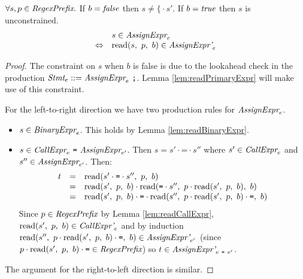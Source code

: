 \documentclass[preprint,10pt]{sigplanconf}
\begin{document}
\begin{lemma}\mbox{}
  
  \( \forall s, p \in \textit{RegexPrefix}. \)
  If \( b = \textit{false} \) then \( s \not = \texttt{\{} \cdot s' \). If \(
  b = \textit{true} \) then \( s \) is unconstrained.
  \[ 
  \begin{array}{rl}
  &s \in \textit{AssignExpr}_{e} 
  \\
  \Leftrightarrow&
  \textrm{read}(s,~p,~b) \in \textit{AssignExpr'}_{e} 
  \end{array}
  \]
  
\end{lemma}
\begin{proof}
  The constraint on \( s \) when \( b \) is false is due to the
  lookahead check in the production \( \textit{Stmt}_{e} ::=
  \textit{AssignExpr}_{e}~\texttt{;} \). Lemma \ref{lem:readPrimaryExpr}
  will make use of this constraint.

  For the left-to-right direction we have two production rules for
  \( \textit{AssignExpr}_{e} \).
  \begin{itemize}
  \item \( s \in \textit{BinaryExpr}_{e} \). This holds by Lemma
    \ref{lem:readBinaryExpr}.
    
  \item \( s \in \textit{CallExpr}_{e} ~\texttt{=}~
    \textit{AssignExpr}_{e'} \).
    Then \( s = s' \cdot \texttt{=} \cdot s'' \) where \( s' \in
    \textit{CallExpr}_{e} \) and \( s'' \in
    \textit{AssignExpr}_{e'} \). Then:
    \[
    \begin{array}{rcl}
      t &=& \textrm{read}(s' \cdot \texttt{=} \cdot s'',~p,~b)
      \\
      &=& \textrm{read}(s',~p,~b)
      \cdot \textrm{read}(\texttt{=}\cdot s'',~p \cdot \textrm{read}(s',~p,~b),~b)
      \\
      &=& \textrm{read}(s',~p,~b) \cdot \texttt{=} \cdot
      \textrm{read}(s'',~p \cdot \textrm{read}(s',~p,~b) \cdot \texttt{=},~b)
    \end{array}
    \]
    Since \( p \in \textit{RegexPrefix} \) by Lemma
    \ref{lem:readCallExpr}, \( \textrm{read}(s',~p,~b) \in
    \textit{CallExpr'}_{e} \) and by induction \( \textrm{read}(s'',~p
      \cdot \textrm{read}(s',~p,~b) \cdot \texttt{=},~b) \in
    \textit{AssignExpr'}_{e'} \) 
    (since \( p \cdot \textrm{read}(s',~p,~b) \cdot \texttt{=} \in \textit{RegexPrefix} \)) so \( t \in
    \textit{AssignExpr'}_{e~\texttt{=}~e'} \).
  \end{itemize}
  
  The argument for the right-to-left direction is similar.
\end{proof}
\end{document}
